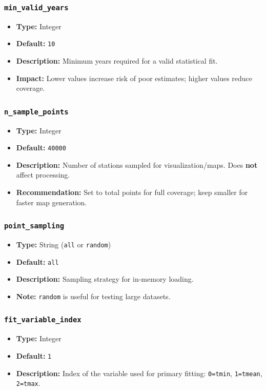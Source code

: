 \documentclass[12pt,a4paper]{article}
\begin{document}
\subsubsection{\texttt{min\_valid\_years}}
\begin{itemize}[leftmargin=*]
    \item \textbf{Type:} Integer
    \item \textbf{Default:} \texttt{10}
    \item \textbf{Description:} Minimum years required for a valid statistical fit.
    \item \textbf{Impact:} Lower values increase risk of poor estimates; higher values reduce coverage.
\end{itemize}

\subsubsection{\texttt{n\_sample\_points}}
\begin{itemize}[leftmargin=*]
    \item \textbf{Type:} Integer
    \item \textbf{Default:} \texttt{40000}
    \item \textbf{Description:} Number of stations sampled for visualization/maps. Does \textbf{not} affect processing.
    \item \textbf{Recommendation:} Set to total points for full coverage; keep smaller for faster map generation.
\end{itemize}

\subsubsection{\texttt{point\_sampling}}
\begin{itemize}[leftmargin=*]
    \item \textbf{Type:} String (\texttt{all} or \texttt{random})
    \item \textbf{Default:} \texttt{all}
    \item \textbf{Description:} Sampling strategy for in-memory loading.
    \item \textbf{Note:} \texttt{random} is useful for testing large datasets.
\end{itemize}

\subsubsection{\texttt{fit\_variable\_index}}
\begin{itemize}[leftmargin=*]
    \item \textbf{Type:} Integer
    \item \textbf{Default:} \texttt{1}
    \item \textbf{Description:} Index of the variable used for primary fitting: \texttt{0=tmin}, \texttt{1=tmean}, \texttt{2=tmax}.
\end{itemize}
\end{document}
